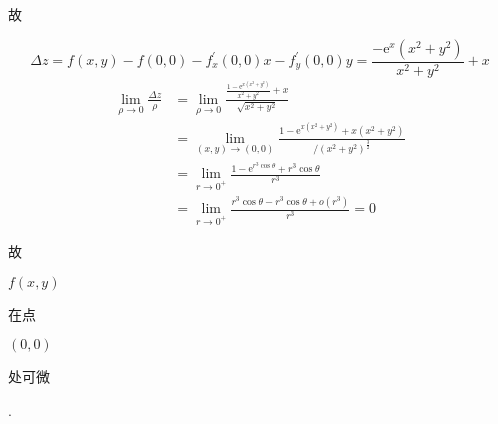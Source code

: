 \documentclass[10pt]{article}
\begin{document}
\begin{CJK}{UTF8}{mj}故\end{CJK}
$$
\Delta z=f(x, y)-f(0,0)-f_{x}^{\prime}(0,0) x-f_{y}^{\prime}(0,0) y=\frac{-\mathrm{e}^{x}\left(x^{2}+y^{2}\right)}{x^{2}+y^{2}}+x
$$
$$
\begin{aligned}
\lim _{\rho \rightarrow 0} \frac{\Delta z}{\rho} &=\lim _{\rho \rightarrow 0} \frac{\frac{1-\mathrm{e}^{x\left(x^{2}+y^{2}\right)}}{x^{2}+y^{2}}+x}{\sqrt{x^{2}+y^{2}}} \\
&=\lim _{(x, y) \rightarrow(0,0)} \frac{1-\mathrm{e}^{x\left(x^{2}+y^{2}\right)}+x\left(x^{2}+y^{2}\right)}{/\left(x^{2}+y^{2}\right)^{\frac{3}{2}}} \\
&=\lim _{r \rightarrow 0^{+}} \frac{1-\mathrm{e}^{r^{3} \cos \theta}+r^{3} \cos \theta}{r^{3}} \\
&=\lim _{r \rightarrow 0^{+}} \frac{r^{3} \cos \theta-r^{3} \cos \theta+o\left(r^{3}\right)}{r^{3}}=0
\end{aligned}
$$
\begin{CJK}{UTF8}{mj}故\end{CJK} $f(x, y)$ \begin{CJK}{UTF8}{mj}在点\end{CJK} $(0,0)$ \begin{CJK}{UTF8}{mj}处可微\end{CJK}.
\end{document}
